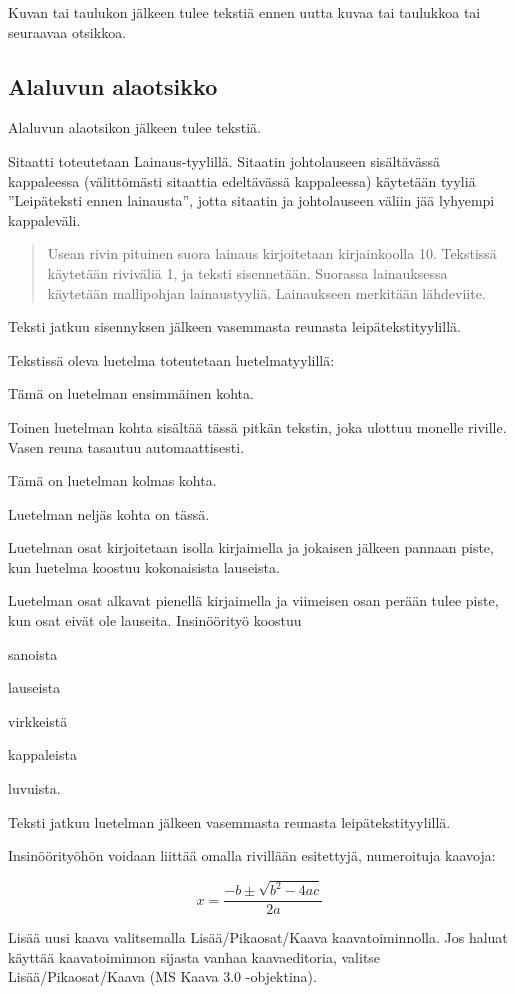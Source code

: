 Kuvan tai taulukon jälkeen tulee tekstiä ennen uutta kuvaa tai taulukkoa tai seuraavaa otsikkoa.

\subsection{Alaluvun alaotsikko}

Alaluvun alaotsikon jälkeen tulee tekstiä.

Sitaatti toteutetaan Lainaus-tyylillä. Sitaatin johtolauseen sisältävässä kappaleessa (välittömästi sitaattia edeltävässä kappaleessa) käytetään tyyliä ”Leipäteksti ennen lainausta”, jotta sitaatin ja johtolauseen väliin jää lyhyempi kappaleväli.

\begin{quote}
Usean rivin pituinen suora lainaus kirjoitetaan kirjainkoolla 10. Tekstissä käytetään riviväliä 1, ja teksti sisennetään. Suorassa lainauksessa käytetään mallipohjan lainaustyyliä. Lainaukseen merkitään lähdeviite.
\end{quote}

Teksti jatkuu sisennyksen jälkeen vasemmasta reunasta leipätekstityylillä.

Tekstissä oleva luetelma toteutetaan luetelmatyylillä:

\begin{bullet-list}
  \item Tämä on luetelman ensimmäinen kohta.
  \item Toinen luetelman kohta sisältää tässä pitkän tekstin, joka ulottuu monelle riville. Vasen reuna tasautuu automaattisesti.
  \item Tämä on luetelman kolmas kohta.
  \item Luetelman neljäs kohta on tässä.
\end{bullet-list}

Luetelman osat kirjoitetaan isolla kirjaimella ja jokaisen jälkeen pannaan piste, kun luetelma koostuu kokonaisista lauseista.

Luetelman osat alkavat pienellä kirjaimella ja viimeisen osan perään tulee piste, kun osat eivät ole lauseita. Insinöörityö koostuu

\begin{bullet-list}
  \item sanoista
  \item lauseista
  \item virkkeistä
  \item kappaleista
  \item luvuista.
\end{bullet-list}

Teksti jatkuu luetelman jälkeen vasemmasta reunasta leipätekstityylillä.

Insinöörityöhön voidaan liittää omalla rivillään esitettyjä, numeroituja kaavoja:

\begin{equation}
  x = \frac{-b \pm \sqrt{b^{2} - 4ac}}{2a}
\end{equation}

Lisää uusi kaava valitsemalla Lisää/Pikaosat/Kaava kaavatoiminnolla. Jos haluat käyttää kaavatoiminnon sijasta vanhaa kaavaeditoria, valitse Lisää/Pikaosat/Kaava (MS Kaava 3.0 -objektina).